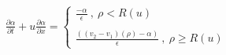 \documentclass[12pt]{article}
\begin{document}
\begin{align} %
\tag{1.3}     %
\frac{\partial\alpha}{\partial t} + u \frac{\partial\alpha}{\partial x} = 
\left\{            %
\begin{array}{l} %
 \frac{-\alpha}{\epsilon}\ ,\ \rho < R(u) \\ 
 \\
 \frac{((v_2 - v_1)(\rho) - \alpha)}{\epsilon}\ ,\ \rho \ge R(u)
\end{array} \right.
\end{align}
\end{document}
